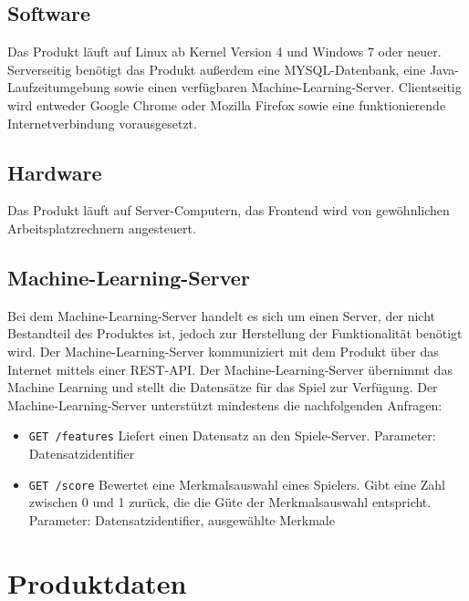 \documentclass[a4paper]{scrreprt}
\begin{document}
    \section{Software}
    Das \Gls{Produkt} läuft auf Linux ab Kernel Version 4 und Windows 7 oder neuer.
    Serverseitig benötigt das Produkt außerdem eine MYSQL-Datenbank, eine Java-Laufzeitumgebung sowie einen verfügbaren Machine-Learning-Server.
    Clientseitig wird entweder Google Chrome oder Mozilla Firefox sowie eine funktionierende Internetverbindung vorausgesetzt.

    \section{Hardware}
    Das \Gls{Produkt} läuft auf Server-Computern, das Frontend wird von gewöhnlichen Arbeitsplatzrechnern angesteuert.

    \section{Machine-Learning-Server}
    Bei dem Machine-Learning-Server handelt es sich um einen Server, der nicht Bestandteil des Produktes ist, jedoch zur Herstellung der Funktionalität benötigt wird.
    Der Machine-Learning-Server kommuniziert mit dem Produkt über das Internet mittels einer REST-API.
    Der Machine-Learning-Server übernimmt das Machine Learning und stellt die Datensätze für das Spiel zur Verfügung.
    Der Machine-Learning-Server unterstützt mindestens die nachfolgenden Anfragen:
    \begin{itemize}
        \item \texttt{GET /features} Liefert einen \Gls{Datensatz} an den Spiele-Server.
        Parameter: Datensatzidentifier
        \item \texttt{GET /score} Bewertet eine Merkmalsauswahl eines Spielers.
        Gibt eine Zahl zwischen 0 und 1 zurück, die die Güte der Merkmalsauswahl entspricht.
        Parameter: Datensatzidentifier, ausgewählte Merkmale
    \end{itemize}


    \chapter{Produktdaten}
\end{document}
